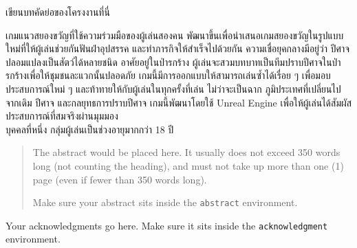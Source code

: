 \maketitle
\makesignature

\ifproject
\begin{abstractTH}
เขียนบทคัดย่อของโครงงานที่นี่

เกมแนวสยองขวัญที่ใช้ความร่วมมือของผู้เล่นสองคน พัฒนาขึ้นเพื่อนำเสนอเกมสยองขวัญในรูปแบบใหม่ที่ให้ผู้เล่นช่วยกันฟันฝ่าอุปสรรค และทำภารกิจให้สำเร็จไปด้วยกัน ความเชื่อยุคกลางมีอยู่ว่า ปีศาจปลอมแปลงเป็นสัตว์ได้หลายชนิด อาศัยอยู่ในป่ารกร้าง ผู้เล่นจะสวมบทบาทเป็นทีมปราบปีศาจในป่ารกร้างเพื่อให้ชุมชนละแวกนั้นปลอดภัย เกมนี้มีการออกแบบให้สามารถเล่นซ้ำได้เรื่อย ๆ เพื่อมอบประสบการณ์ใหม่ ๆ และท้าทายให้กับผู้เล่นในทุกครั้งที่เล่น ไม่ว่าจะเป็นฉาก ภูมิประเทศที่เปลี่ยนไปจากเดิม ปีศาจ และกลยุทธการปราบปีศาจ เกมนี้พัฒนาโดยใช้ Unreal Engine เพื่อให้ผู้เล่นได้สัมผัสประสบการณ์ที่สมจริงผ่านมุมมอง \\ บุคคลที่หนึ่ง กลุ่มผู้เล่นเป็นช่วงอายุมากกว่า 18 ปี
\end{abstractTH}

\begin{abstract}
The abstract would be placed here. It usually does not exceed 350 words
long (not counting the heading), and must not take up more than one (1) page
(even if fewer than 350 words long).

Make sure your abstract sits inside the \texttt{abstract} environment.
\end{abstract}

\iffalse
\begin{dedication}
This document is dedicated to all Chiang Mai University students.

Dedication page is optional.
\end{dedication}
\fi %

\begin{acknowledgments}
Your acknowledgments go here. Make sure it sits inside the
\texttt{acknowledgment} environment.

\end{acknowledgments}%
\fi %

\contentspage

\ifproject
\figurelistpage

\tablelistpage
\fi %



